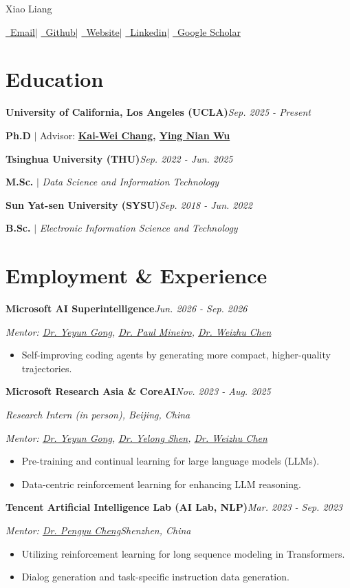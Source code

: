 \documentclass[12pt,a4paper]{article}
\newcommand{\row}[2]{\textbf{#1}\hfill\textit{#2}\par}
\newcommand{\degree}[1]{\vspace{4pt}#1\par\vspace{11pt}}
\newcommand{\mentor}[1]{\vspace{8pt}\textit{Mentor: #1}\par}
\newcommand{\gong}{\href{https://scholar.google.com/citations?user=piUkwMYAAAAJ&hl=en}{Dr. Yeyun Gong}}
\newcommand{\chen}{\href{https://scholar.google.com/citations?user=LG_E-4EAAAAJ&hl=en}{Dr. Weizhu Chen}}
\newcommand{\scholar}{https://scholar.google.com/citations?user=JHWyBKIAAAAJ&hl=en}
\begin{document}
\begin{center}
{\fontsize{24.88}{30}\selectfont Xiao Liang}\par
\vspace{10pt}
\href{mailto:vitoliang0601@gmail.com}{\faEnvelope\ Email}\quad$|$\quad
\href{https://github.com/MasterVito}{\faGithub\ Github}\quad$|$\quad
\href{https://mastervito.github.io/}{\faGlobe\ Website}\quad$|$\quad
\href{https://www.linkedin.com/in/xiao-liang-63a120273/}{\faLinkedin\ Linkedin}\quad$|$\quad
\href{\scholar}{\faGraduationCap\ Google Scholar}
\end{center}
\vspace{-4pt}
\section*{Education}
\row{University of California, Los Angeles (UCLA)}{Sep. 2025 - Present}
\degree{\textbf{Ph.D} $|$ Advisor: \textbf{\href{https://web.cs.ucla.edu/~kwchang/}{Kai-Wei Chang}, \href{http://www.stat.ucla.edu/~ywu/me.html}{Ying Nian Wu}}}
\row{Tsinghua University (THU)}{Sep. 2022 - Jun. 2025}
\degree{\textbf{M.Sc.} $|$ \textit{Data Science and Information Technology}}
\row{Sun Yat-sen University (SYSU)}{Sep. 2018 - Jun. 2022}
\degree{\textbf{B.Sc.} $|$ \textit{Electronic Information Science and Technology}}
\vspace{-11pt}
\section*{Employment \& Experience}
\row{Microsoft AI Superintelligence}{Jun. 2026 - Sep. 2026}
\mentor{\gong, \href{https://scholar.google.com/citations?user=pl-qLQwAAAAJ&hl=en}{Dr. Paul Mineiro}, \chen}
\begin{itemize}
\item Self-improving coding agents by generating more compact, higher-quality trajectories.
\end{itemize}
\vspace{9pt}
\row{Microsoft Research Asia \& CoreAI}{Nov. 2023 - Aug. 2025}
\vspace{4pt}\textit{Research Intern (in person), Beijing, China}\par
\mentor{\gong, \href{https://scholar.google.com/citations?user=S6OFEFEAAAAJ&hl=en}{Dr. Yelong Shen}, \chen}
\begin{itemize}
\item Pre-training and continual learning for large language models (LLMs).
\item Data-centric reinforcement learning for enhancing LLM reasoning.
\end{itemize}
\vspace{9pt}
\row{Tencent Artificial Intelligence Lab (AI Lab, NLP)}{Mar. 2023 - Sep. 2023}
\mentor{\href{https://linear95.github.io/}{Dr. Pengyu Cheng}\hfill Shenzhen, China}
\begin{itemize}
\item Utilizing reinforcement learning for long sequence modeling in Transformers.
\item Dialog generation and task-specific instruction data generation.
\end{itemize}
\end{document}
